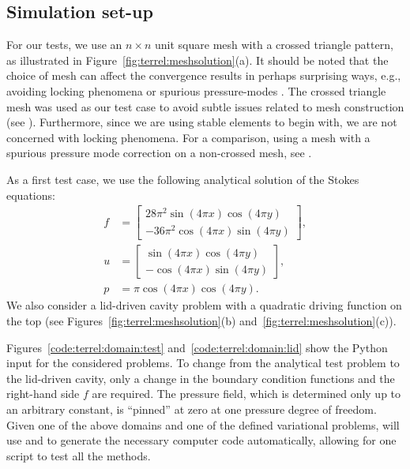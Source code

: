 \subsection{Simulation set-up}

For our tests, we use an $n \times n$ unit square
mesh with a crossed triangle pattern, as illustrated in
Figure~\ref{fig:terrel:meshsolution}(a). It should be noted that the
choice of mesh can affect the convergence results in perhaps surprising
ways, e.g., avoiding locking phenomena \citep{NagtegaalDeJong1974}
or spurious pressure-modes \citep{Malkus2000}. The crossed
triangle mesh was used as our test case to avoid subtle
issues related to mesh construction (see \citet[Proposition~6.1,
Section~VI.6]{BrezziFortin1991}). Furthermore, since we are using stable
elements to begin with, we are not concerned with locking phenomena. For
a comparison, using a mesh with a spurious pressure mode correction on
a non-crossed mesh, see \citet{TerrelScott2008}.

As a first test case, we use the following analytical solution of the
Stokes equations:
%
\begin{align}
\label{eqn:terrel:testcase}
  f &=
    \begin{bmatrix}
      28\pi^2\sin(4\pi x)\cos(4\pi y)
      \\
      -36\pi^2\cos(4\pi x)\sin(4\pi y)
    \end{bmatrix},
\\
  u &=
  \begin{bmatrix}
    \sin(4\pi x)\cos(4\pi y)
      \\
     -\cos(4\pi x)\sin(4\pi y)
   \end{bmatrix},
\\
  p &= \pi\cos(4\pi x)\cos(4\pi y).
\end{align}
%
We also consider a lid-driven cavity problem with a quadratic driving
function on the top (see Figures~\ref{fig:terrel:meshsolution}(b)
and~\ref{fig:terrel:meshsolution}(c)).

Figures~\ref{code:terrel:domain:test} and~\ref{code:terrel:domain:lid}
show the \dolfin{} Python input for the considered problems. To change
from the analytical test problem to the lid-driven cavity, only a
change in the boundary condition functions and the right-hand side
$f$ are required.  The pressure field, which is determined only up to
an arbitrary constant, is ``pinned'' at zero at one pressure degree
of freedom.  Given one of the above domains and one of the defined
variational problems, \dolfin{} will use \ffc{} and \fiat{} to generate
the necessary computer code automatically, allowing for one script to
test all the methods.

